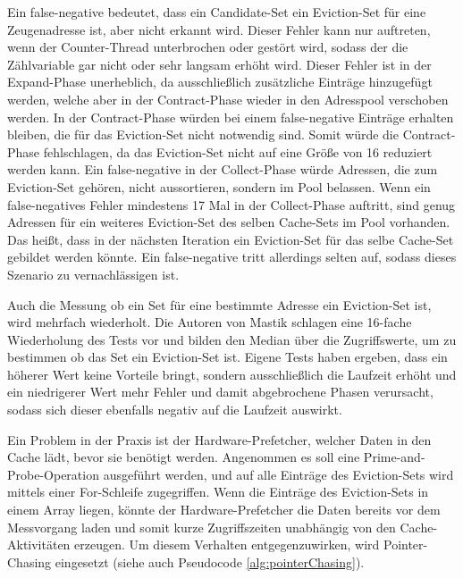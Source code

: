 Ein false-negative bedeutet, dass ein Candidate-Set ein Eviction-Set für eine Zeugenadresse ist, aber nicht erkannt wird.
Dieser Fehler kann nur auftreten, wenn der Counter-Thread unterbrochen oder gestört wird, sodass der die Zählvariable gar nicht oder sehr langsam erhöht wird.
Dieser Fehler ist in der Expand-Phase unerheblich, da ausschließlich zusätzliche Einträge hinzugefügt werden, welche aber in der Contract-Phase wieder in den Adresspool verschoben werden.
In der Contract-Phase würden bei einem false-negative Einträge erhalten bleiben, die für das Eviction-Set nicht notwendig sind. Somit würde die Contract-Phase fehlschlagen, da das Eviction-Set nicht auf eine Größe von 16 reduziert werden kann.
Ein false-negative in der Collect-Phase würde Adressen, die zum Eviction-Set gehören, nicht aussortieren, sondern im Pool belassen.
Wenn ein false-negatives Fehler mindestens 17 Mal in der Collect-Phase auftritt, sind genug Adressen für ein weiteres Eviction-Set des selben Cache-Sets im Pool vorhanden. Das heißt, dass in der nächsten Iteration ein Eviction-Set für das selbe Cache-Set gebildet werden könnte.
Ein false-negative tritt allerdings selten auf, sodass dieses Szenario zu vernachlässigen ist.


Auch die Messung ob ein Set für eine bestimmte Adresse ein Eviction-Set ist, wird mehrfach wiederholt.
Die Autoren von Mastik schlagen eine 16-fache Wiederholung des Tests vor und bilden den Median über die Zugriffswerte, um zu bestimmen ob das Set ein Eviction-Set ist.
Eigene Tests haben ergeben, dass ein höherer Wert keine Vorteile bringt, sondern ausschließlich die Laufzeit erhöht und ein niedrigerer Wert mehr Fehler und damit abgebrochene Phasen verursacht, sodass sich dieser ebenfalls negativ auf die Laufzeit auswirkt.

Ein Problem in der Praxis ist der Hardware-Prefetcher, welcher Daten in den Cache lädt, bevor sie benötigt werden.
Angenommen es soll eine Prime-and-Probe-Operation ausgeführt werden, und auf alle Einträge des Eviction-Sets wird mittels einer For-Schleife zugegriffen.
Wenn die Einträge des Eviction-Sets in einem Array liegen, könnte der Hardware-Prefetcher die Daten bereits vor dem Messvorgang laden und somit kurze Zugriffszeiten unabhängig von den Cache-Aktivitäten erzeugen.
Um diesem Verhalten entgegenzuwirken, wird Pointer-Chasing eingesetzt (siehe auch Pseudocode \ref{alg:pointerChasing}).

